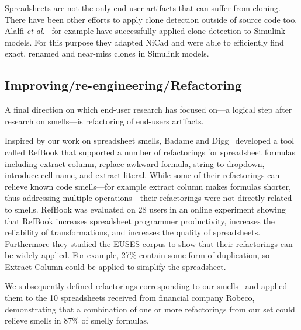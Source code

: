 \documentclass[conference]{IEEEtran}
\begin{document}
Spreadsheets are not the only end-user artifacts that can suffer from cloning. There have been other efforts to apply clone detection outside of source code too. Alalfi \emph{et al.}~\cite{DBLP:conf/icsm/Alalfi2012} for example have successfully applied clone detection to Simulink models. For this purpose they adapted NiCad and were able to efficiently find exact, renamed and near-miss clones in Simulink models.

\subsection{Improving/re-engineering/Refactoring}
A final direction on which end-user research has focused on---a logical step after research on smells---is refactoring of end-users artifacts. 


Inspired by our work on spreadsheet smells, Badame and Digg~\cite{badame_refactoring_2012} developed a tool called RefBook that supported a number of refactorings for spreadsheet formulas including extract column, replace awkward formula, string to dropdown, introduce cell name, and extract literal. While some of their refactorings can relieve known code smells---for example extract column makes formulas shorter, thus addressing multiple operations---their refactorings were not directly related to smells. RefBook was evaluated on 28 users in an online experiment showing that RefBook increases spreadsheet programmer
productivity, increases the reliability of transformations, and increases the quality of spreadsheets. Furthermore they studied the EUSES corpus to show that their refactorings can be widely applied. For example,  27\%  contain some form of duplication, so Extract Column could be applied to simplify the spreadsheet.

We subsequently defined refactorings corresponding to our smells~\cite{hermans_detecting_2014} and applied them to the 10 spreadsheets received from financial company Robeco, demonstrating that a combination of one or more refactorings from our set could relieve smells in 87\% of smelly formulas.
\end{document}

